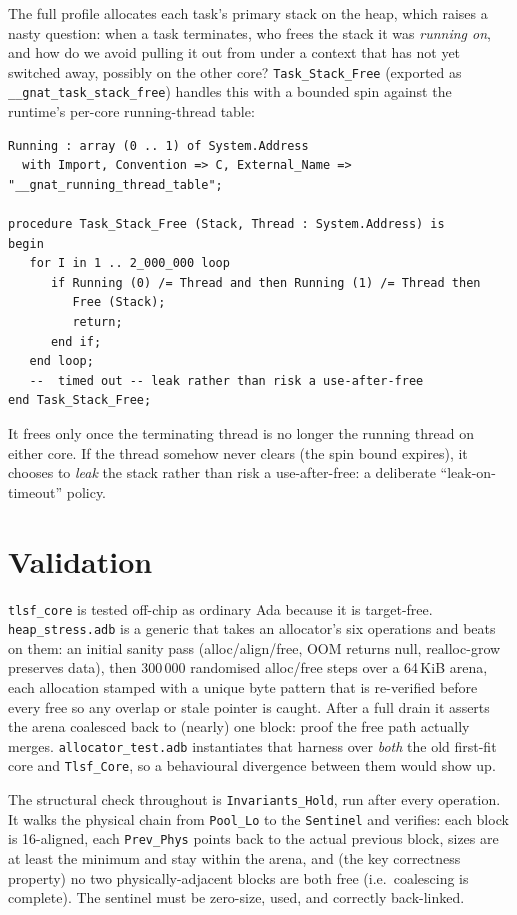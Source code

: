 The full profile allocates each task's primary stack on the heap, which raises a
nasty question: when a task terminates, who frees the stack it was \emph{running
on}, and how do we avoid pulling it out from under a context that has not yet
switched away, possibly on the other core? \texttt{Task\_Stack\_Free}
(exported as \texttt{\_\_gnat\_task\_stack\_free}) handles this with a bounded
spin against the runtime's per-core running-thread table:

\begin{lstlisting}
Running : array (0 .. 1) of System.Address
  with Import, Convention => C, External_Name => "__gnat_running_thread_table";

procedure Task_Stack_Free (Stack, Thread : System.Address) is
begin
   for I in 1 .. 2_000_000 loop
      if Running (0) /= Thread and then Running (1) /= Thread then
         Free (Stack);
         return;
      end if;
   end loop;
   --  timed out -- leak rather than risk a use-after-free
end Task_Stack_Free;
\end{lstlisting}

It frees only once the terminating thread is no longer the running thread on
either core. If the thread somehow never clears (the spin bound expires), it
chooses to \emph{leak} the stack rather than risk a use-after-free: a deliberate
``leak-on-timeout'' policy.

\section{Validation}
\label{sec:heap-validation}

\texttt{tlsf\_core} is tested off-chip as ordinary Ada because it is
target-free.
\texttt{heap\_stress.adb} is a generic that takes an allocator's six operations
and beats on them: an initial sanity pass (alloc/align/free, OOM returns null,
realloc-grow preserves data), then 300\,000 randomised alloc/free steps over a
64\,KiB arena, each allocation stamped with a unique byte pattern that is
re-verified before every free so any overlap or stale pointer is caught. After a
full drain it asserts the arena coalesced back to (nearly) one block: proof the
free path actually merges. \texttt{allocator\_test.adb} instantiates that harness
over \emph{both} the old first-fit core and \texttt{Tlsf\_Core}, so a behavioural
divergence between them would show up.

The structural check throughout is \texttt{Invariants\_Hold}, run after every
operation. It walks the physical chain from \texttt{Pool\_Lo} to the
\texttt{Sentinel} and verifies: each block is 16-aligned, each
\texttt{Prev\_Phys} points back to the actual previous block, sizes are at least
the minimum and stay within the arena, and (the key correctness property) no
two physically-adjacent blocks are both free (i.e.\ coalescing is complete). The
sentinel must be zero-size, used, and correctly back-linked.

